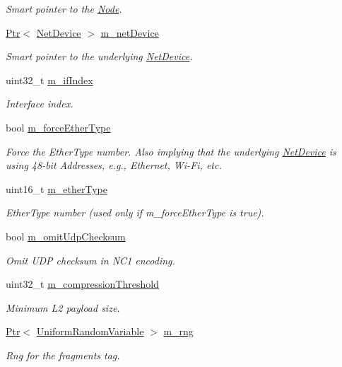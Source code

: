 \begin{DoxyCompactItemize}
\begin{DoxyCompactList}\small\item\em Smart pointer to the \hyperlink{classns3_1_1Node}{Node}. \end{DoxyCompactList}\item 
\hyperlink{classns3_1_1Ptr}{Ptr}$<$ \hyperlink{classns3_1_1NetDevice}{Net\+Device} $>$ \hyperlink{classns3_1_1SixLowPanNetDevice_a758b615a8b8f811ae3517ab9c7574f7b}{m\+\_\+net\+Device}
\begin{DoxyCompactList}\small\item\em Smart pointer to the underlying \hyperlink{classns3_1_1NetDevice}{Net\+Device}. \end{DoxyCompactList}\item 
uint32\+\_\+t \hyperlink{classns3_1_1SixLowPanNetDevice_ab07b4be5672c71fc3c069c3d5b44e75f}{m\+\_\+if\+Index}
\begin{DoxyCompactList}\small\item\em Interface index. \end{DoxyCompactList}\item 
bool \hyperlink{classns3_1_1SixLowPanNetDevice_a57d9f56656023ad738e092ba9f668192}{m\+\_\+force\+Ether\+Type}
\begin{DoxyCompactList}\small\item\em Force the Ether\+Type number. Also implying that the underlying \hyperlink{classns3_1_1NetDevice}{Net\+Device} is using 48-\/bit Addresses, e.\+g., Ethernet, Wi-\/\+Fi, etc. \end{DoxyCompactList}\item 
uint16\+\_\+t \hyperlink{classns3_1_1SixLowPanNetDevice_afdea8e77d8ec66aef94e8cdbb645004b}{m\+\_\+ether\+Type}
\begin{DoxyCompactList}\small\item\em Ether\+Type number (used only if m\+\_\+force\+Ether\+Type is true). \end{DoxyCompactList}\item 
bool \hyperlink{classns3_1_1SixLowPanNetDevice_aa3503adbbb86b19e4ec2d17f3c8436f7}{m\+\_\+omit\+Udp\+Checksum}
\begin{DoxyCompactList}\small\item\em Omit U\+DP checksum in N\+C1 encoding. \end{DoxyCompactList}\item 
uint32\+\_\+t \hyperlink{classns3_1_1SixLowPanNetDevice_a61c90503b8ea0015e2c3e4dc1f599582}{m\+\_\+compression\+Threshold}
\begin{DoxyCompactList}\small\item\em Minimum L2 payload size. \end{DoxyCompactList}\item 
\hyperlink{classns3_1_1Ptr}{Ptr}$<$ \hyperlink{classns3_1_1UniformRandomVariable}{Uniform\+Random\+Variable} $>$ \hyperlink{classns3_1_1SixLowPanNetDevice_a2790a5f0228097a1e52b728dcdbf70d2}{m\+\_\+rng}
\begin{DoxyCompactList}\small\item\em Rng for the fragments tag. \end{DoxyCompactList}\end{DoxyCompactItemize}
